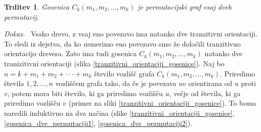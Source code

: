 \documentclass[a4paper, 12pt]{book}
\newtheorem{trditev}{Trditev}[chapter]
\newenvironment{dokaz}{\emph{Dokaz.}\ }{\hspace{\fill}{$\Box$}}
\begin{document}
\begin{trditev}
\label{trditev_gosenica_vsaj_dve_permutaciji}
    Gosenica $C_k(m_1, m_2, \dots, m_k)$ je permutacijski graf vsaj dveh permutacij.
\end{trditev}
\begin{dokaz}
    Vsako drevo, z vsaj eno povezavo ima natanko dve tranzitivni orientaciji. To sledi iz dejstva, da ko usmerimo eno povezavo smo že določili tranzitivno orientacijo drevesa. Zato ima tudi gosenica $C_k(m_1, m_2, \dots, m_k)$ natanko dve tranizitivni orientaciji (slika \ref{tranzitivni_orientaciji_gosenice}).
    Naj bo $n = k + m_1 + m_2 + \cdot\cdot\cdot + m_k$ število vozlišč grafa $C_k(m_1, m_2, \dots, m_k)$. Priredimo števila $1, 2, \dots, n$ vozliščem grafa tako, da če je povezava $uv$ orientirana od $u$ proti $v$, potem mora biti število, ki ga priredimo vozlišču $u$, večje od števila, ki ga priredimo vozlišču $v$ (primer na sliki \ref{tranzitivni_orientaciji_gosenice}). To bomo naredili induktivno na dva načina (slike \ref{tranzitivni_orientaciji_gosenice}, \ref{gosenica_dve_permutaciji1}, \ref{gosenica_dve_permutaciji2}). 

    \begin{figure}[h]
        \begin{center}        
\end{center}
\end{figure}
\end{dokaz}
\end{document}
